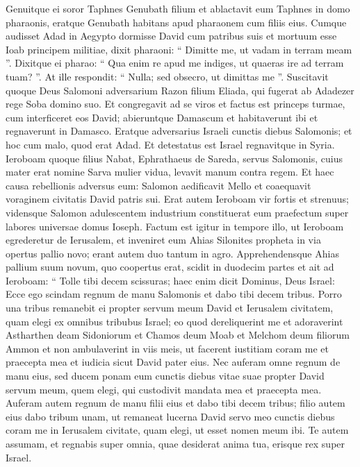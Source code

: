 \begin{biblechapter}
\begin{biblechapter}
\begin{biblechapter}
\begin{biblechapter}
\begin{biblechapter}
\begin{biblechapter}
\begin{biblechapter}
\begin{biblechapter}
\begin{biblechapter}
\begin{biblechapter}
\begin{biblechapter}
\verse Genuitque ei soror Taphnes Genubath filium et ablactavit eum Taphnes in domo pharaonis, eratque Genubath habitans apud pharaonem cum filiis eius. 
\verse Cumque audisset Adad in Aegypto dormisse David cum patribus suis et mortuum esse Ioab principem militiae, dixit pharaoni: “ Dimitte me, ut vadam in terram meam ”. 
\verse Dixitque ei pharao: “ Qua enim re apud me indiges, ut quaeras ire ad terram tuam? ”. At ille respondit: “ Nulla; sed obsecro, ut dimittas me ”.
 \verse Suscitavit quoque Deus Salomoni adversarium Razon filium Eliada, qui fugerat ab Adadezer rege Soba domino suo. 
\verse Et congregavit ad se viros et factus est princeps turmae, cum interficeret eos David; abieruntque Damascum et habitaverunt ibi et regnaverunt in Damasco. 
\verse Eratque adversarius Israeli cunctis diebus Salomonis; et hoc cum malo, quod erat Adad. Et detestatus est Israel regnavitque in Syria.
 \verse Ieroboam quoque filius Nabat, Ephrathaeus de Sareda, servus Salomonis, cuius mater erat nomine Sarva mulier vidua, levavit manum contra regem. 
\verse Et haec causa rebellionis adversus eum: Salomon aedificavit Mello et coaequavit voraginem civitatis David patris sui. 
\verse Erat autem Ieroboam vir fortis et strenuus; vidensque Salomon adulescentem industrium constituerat eum praefectum super labores universae domus Ioseph.
 \verse Factum est igitur in tempore illo, ut Ieroboam egrederetur de Ierusalem, et inveniret eum Ahias Silonites propheta in via opertus pallio novo; erant autem duo tantum in agro. 
\verse Apprehendensque Ahias pallium suum novum, quo coopertus erat, scidit in duodecim partes 
\verse et ait ad Ieroboam: “ Tolle tibi decem scissuras; haec enim dicit Dominus, Deus Israel: Ecce ego scindam regnum de manu Salomonis et dabo tibi decem tribus. 
\verse Porro una tribus remanebit ei propter servum meum David et Ierusalem civitatem, quam elegi ex omnibus tribubus Israel; 
\verse eo quod dereliquerint me et adoraverint Astharthen deam Sidoniorum et Chamos deum Moab et Melchom deum filiorum Ammon et non ambulaverint in viis meis, ut facerent iustitiam coram me et praecepta mea et iudicia sicut David pater eius. 
\verse Nec auferam omne regnum de manu eius, sed ducem ponam eum cunctis diebus vitae suae propter David servum meum, quem elegi, qui custodivit mandata mea et praecepta mea. 
\verse Auferam autem regnum de manu filii eius et dabo tibi decem tribus; 
\verse filio autem eius dabo tribum unam, ut remaneat lucerna David servo meo cunctis diebus coram me in Ierusalem civitate, quam elegi, ut esset nomen meum ibi. 
\verse Te autem assumam, et regnabis super omnia, quae desiderat anima tua, erisque rex super Israel. 

\end{biblechapter}
\end{biblechapter}
\end{biblechapter}
\end{biblechapter}
\end{biblechapter}
\end{biblechapter}
\end{biblechapter}
\end{biblechapter}
\end{biblechapter}
\end{biblechapter}
\end{biblechapter}
